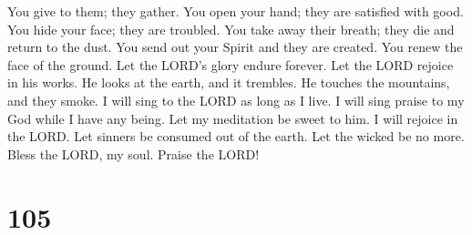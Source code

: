 You give to them; they gather. You open your hand; they
are satisfied with good.  You hide your face; they are
troubled. You take away their breath; they die and return to the dust.
 You send out your Spirit and they are created. You renew
the face of the ground.  Let the LORD's glory endure
forever. Let the LORD rejoice in his works.  He looks at
the earth, and it trembles. He touches the mountains, and they smoke.
 I will sing to the LORD as long as I live. I will sing
praise to my God while I have any being.  Let my meditation
be sweet to him. I will rejoice in the LORD.  Let sinners
be consumed out of the earth. Let the wicked be no more. Bless the LORD,
my soul. Praise the LORD!

\hypertarget{section-95}{%
\section{105}\label{section-95}}

